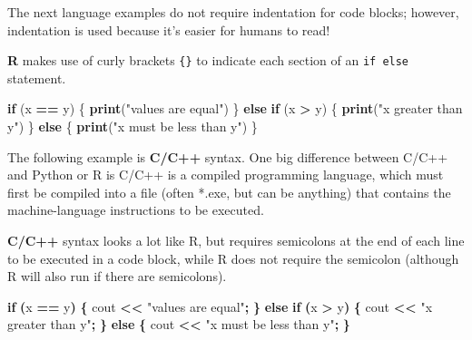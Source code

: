 \documentclass[
]{book}
\newenvironment{Shaded}{\begin{snugshade}}{\end{snugshade}}
\newcommand{\ControlFlowTok}[1]{\textcolor[rgb]{0.13,0.29,0.53}{\textbf{#1}}}
\newcommand{\FunctionTok}[1]{\textcolor[rgb]{0.13,0.29,0.53}{\textbf{#1}}}
\newcommand{\NormalTok}[1]{#1}
\newcommand{\OperatorTok}[1]{\textcolor[rgb]{0.81,0.36,0.00}{\textbf{#1}}}
\newcommand{\SpecialCharTok}[1]{\textcolor[rgb]{0.81,0.36,0.00}{\textbf{#1}}}
\newcommand{\StringTok}[1]{\textcolor[rgb]{0.31,0.60,0.02}{#1}}
\begin{document}
The next language examples do not require indentation for code blocks; however, indentation is used because it's easier for humans to read!

\textbf{R} makes use of curly brackets \texttt{\{\}} to indicate each section of an \texttt{if\ else} statement.

\begin{Shaded}
\begin{Highlighting}[]
\ControlFlowTok{if}\NormalTok{ (x }\SpecialCharTok{==}\NormalTok{ y) \{}
  \FunctionTok{print}\NormalTok{(}\StringTok{"values are equal"}\NormalTok{)}
\NormalTok{\} }\ControlFlowTok{else} \ControlFlowTok{if}\NormalTok{ (x }\SpecialCharTok{\textgreater{}}\NormalTok{ y) \{}
  \FunctionTok{print}\NormalTok{(}\StringTok{"x greater than y"}\NormalTok{)}
\NormalTok{\} }\ControlFlowTok{else}\NormalTok{ \{}
  \FunctionTok{print}\NormalTok{(}\StringTok{"x must be less than y"}\NormalTok{)}
\NormalTok{\}}
\end{Highlighting}
\end{Shaded}

The following example is \textbf{C/C++} syntax. One big difference between C/C++ and Python or R is C/C++ is a compiled programming language, which must first be compiled into a file (often *.exe, but can be anything) that contains the machine-language instructions to be executed.

\textbf{C/C++} syntax looks a lot like R, but requires semicolons at the end of each line to be executed in a code block, while R does not require the semicolon (although R will also run if there are semicolons).

\begin{Shaded}
\begin{Highlighting}[]
\ControlFlowTok{if} \OperatorTok{(}\NormalTok{x }\OperatorTok{==}\NormalTok{ y}\OperatorTok{)} \OperatorTok{\{}
\NormalTok{  cout }\OperatorTok{\textless{}\textless{}} \StringTok{"values are equal"}\OperatorTok{;}
\OperatorTok{\}} \ControlFlowTok{else} \ControlFlowTok{if} \OperatorTok{(}\NormalTok{x }\OperatorTok{\textgreater{}}\NormalTok{ y}\OperatorTok{)} \OperatorTok{\{}
\NormalTok{  cout }\OperatorTok{\textless{}\textless{}} \StringTok{"x greater than y"}\OperatorTok{;}
\OperatorTok{\}} \ControlFlowTok{else} \OperatorTok{\{}
\NormalTok{  cout }\OperatorTok{\textless{}\textless{}} \StringTok{"x must be less than y"}\OperatorTok{;}
\OperatorTok{\}}
\end{Highlighting}
\end{Shaded}
\end{document}
